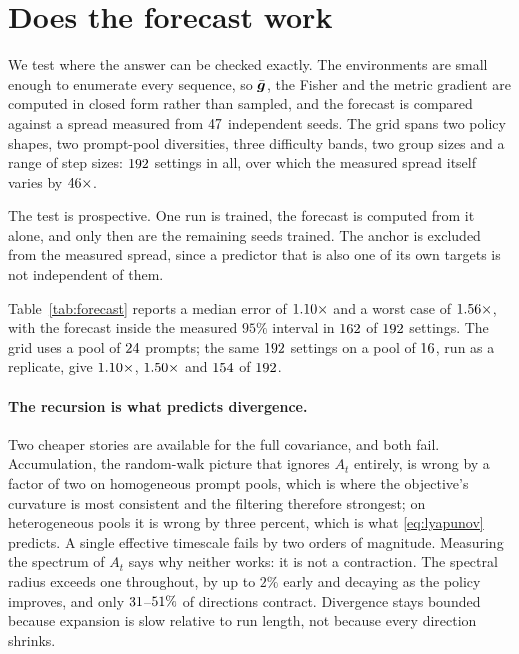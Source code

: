 \section{Does the forecast work}
\label{sec:forecast}

We test where the answer can be checked exactly. The environments are small enough to enumerate
every sequence, so $\bar{\bm{g}}$, the Fisher and the metric gradient are computed in closed form rather
than sampled, and the forecast is compared against a spread measured from
$47$ independent seeds. The grid spans two policy shapes, two prompt-pool
diversities, three difficulty bands, two group sizes and a range of step sizes:
$192$ settings in all, over which the measured spread itself varies by
$46\times$.

The test is prospective. One run is trained, the forecast is computed from it alone, and only then
are the remaining seeds trained. The anchor is excluded from the measured spread, since a
predictor that is also one of its own targets is not independent of them.

\begin{table}[t]
  \centering \small
  
  \caption{Forecast against measured spread, prospectively. Error is the ratio in whichever
  direction exceeds one.}
  \label{tab:forecast}
\end{table}

Table~\ref{tab:forecast} reports a median error of $1.10\times$ and a worst case of
$1.56\times$, with the forecast inside the measured $95\%$ interval in
$162$ of $192$ settings. The grid uses a pool of $24$ prompts; the same $192$
settings on a pool of $16$, run as a replicate, give
$1.10\times$, $1.50\times$ and
$154$ of $192$.

\paragraph{The recursion is what predicts divergence.} Two cheaper stories are available for the
full covariance, and both fail.
Accumulation, the random-walk picture that ignores $A_t$ entirely, is wrong by a factor of two on
homogeneous prompt pools, which is where the objective's curvature is most consistent and the
filtering therefore strongest; on heterogeneous pools it is wrong by three percent, which is what
\eqref{eq:lyapunov} predicts. A single effective timescale fails by two orders of magnitude.
Measuring the spectrum of $A_t$ says why neither works: it is not a contraction. The spectral
radius exceeds one throughout, by up to $2\%$ early and decaying as the policy improves, and only
$31$--$51\%$ of directions contract. Divergence stays bounded
because expansion is slow relative to run length, not because every direction shrinks.

